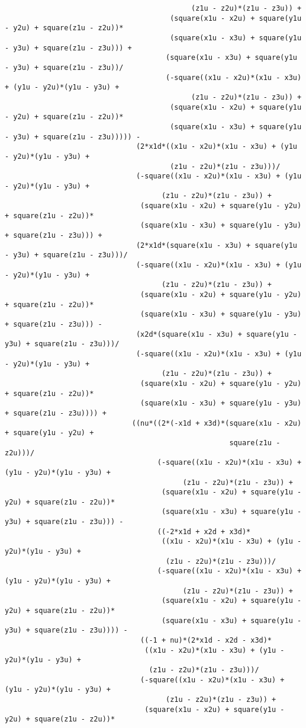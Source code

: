 \begin{lstlisting}
											(z1u - z2u)*(z1u - z3u)) + 
									   (square(x1u - x2u) + square(y1u - y2u) + square(z1u - z2u))*
									   (square(x1u - x3u) + square(y1u - y3u) + square(z1u - z3u))) + 
									  (square(x1u - x3u) + square(y1u - y3u) + square(z1u - z3u))/
									  (-square((x1u - x2u)*(x1u - x3u) + (y1u - y2u)*(y1u - y3u) + 
											(z1u - z2u)*(z1u - z3u)) + 
									   (square(x1u - x2u) + square(y1u - y2u) + square(z1u - z2u))*
									   (square(x1u - x3u) + square(y1u - y3u) + square(z1u - z3u))))) - 
							   (2*x1d*((x1u - x2u)*(x1u - x3u) + (y1u - y2u)*(y1u - y3u) + 
									   (z1u - z2u)*(z1u - z3u)))/
							   (-square((x1u - x2u)*(x1u - x3u) + (y1u - y2u)*(y1u - y3u) + 
									 (z1u - z2u)*(z1u - z3u)) + 
								(square(x1u - x2u) + square(y1u - y2u) + square(z1u - z2u))*
								(square(x1u - x3u) + square(y1u - y3u) + square(z1u - z3u))) + 
							   (2*x1d*(square(x1u - x3u) + square(y1u - y3u) + square(z1u - z3u)))/
							   (-square((x1u - x2u)*(x1u - x3u) + (y1u - y2u)*(y1u - y3u) + 
									 (z1u - z2u)*(z1u - z3u)) + 
								(square(x1u - x2u) + square(y1u - y2u) + square(z1u - z2u))*
								(square(x1u - x3u) + square(y1u - y3u) + square(z1u - z3u))) - 
							   (x2d*(square(x1u - x3u) + square(y1u - y3u) + square(z1u - z3u)))/
							   (-square((x1u - x2u)*(x1u - x3u) + (y1u - y2u)*(y1u - y3u) + 
									 (z1u - z2u)*(z1u - z3u)) + 
								(square(x1u - x2u) + square(y1u - y2u) + square(z1u - z2u))*
								(square(x1u - x3u) + square(y1u - y3u) + square(z1u - z3u)))) + 
							  ((nu*((2*(-x1d + x3d)*(square(x1u - x2u) + square(y1u - y2u) + 
													 square(z1u - z2u)))/
									(-square((x1u - x2u)*(x1u - x3u) + (y1u - y2u)*(y1u - y3u) + 
										  (z1u - z2u)*(z1u - z3u)) + 
									 (square(x1u - x2u) + square(y1u - y2u) + square(z1u - z2u))*
									 (square(x1u - x3u) + square(y1u - y3u) + square(z1u - z3u))) - 
									((-2*x1d + x2d + x3d)*
									 ((x1u - x2u)*(x1u - x3u) + (y1u - y2u)*(y1u - y3u) + 
									  (z1u - z2u)*(z1u - z3u)))/
									(-square((x1u - x2u)*(x1u - x3u) + (y1u - y2u)*(y1u - y3u) + 
										  (z1u - z2u)*(z1u - z3u)) + 
									 (square(x1u - x2u) + square(y1u - y2u) + square(z1u - z2u))*
									 (square(x1u - x3u) + square(y1u - y3u) + square(z1u - z3u)))) - 
								((-1 + nu)*(2*x1d - x2d - x3d)*
								 ((x1u - x2u)*(x1u - x3u) + (y1u - y2u)*(y1u - y3u) + 
								  (z1u - z2u)*(z1u - z3u)))/
								(-square((x1u - x2u)*(x1u - x3u) + (y1u - y2u)*(y1u - y3u) + 
									  (z1u - z2u)*(z1u - z3u)) + 
								 (square(x1u - x2u) + square(y1u - y2u) + square(z1u - z2u))*

\end{lstlisting}
